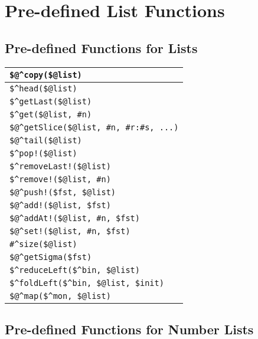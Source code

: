 \chapter{Pre-defined List Functions}

\section{Pre-defined Functions for \fsm{} Lists}

\begin{tabular}{|l|}
\hline
\verb!$@^copy($@list)! \\
\hline
\verb!$^head($@list)! \\
\verb!$^getLast($@list)! \\
\verb!$^get($@list, #n)! \\
\verb!$@^getSlice($@list, #n, #r:#s, ...)! \\
\verb!$@^tail($@list)! \\
\hline
\verb+$^pop!($@list)+ \\
\verb+$^removeLast!($@list)+ \\
\verb+$^remove!($@list, #n)+ \\
\hline
\verb+$@^push!($fst, $@list)+ \\
\verb+$@^add!($@list, $fst)+ \\
\verb+$@^addAt!($@list, #n, $fst)+ \\
\hline
\verb+$@^set!($@list, #n, $fst)+ \\
\hline
\verb!#^size($@list)! \\
\verb!$@^getSigma($fst)! \\
\hline
\verb!$^reduceLeft($^bin, $@list)! \\
\verb!$^foldLeft($^bin, $@list, $init)! \\
\hline
\verb!$@^map($^mon, $@list)! \\
\hline
\end{tabular}

\section{Pre-defined Functions for Number Lists}

